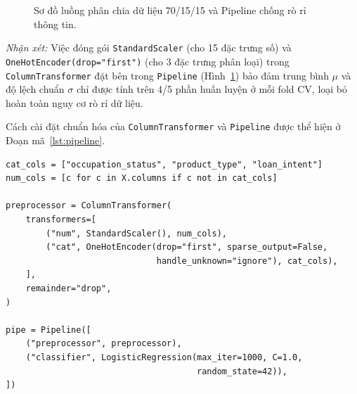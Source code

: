 \documentclass[12pt,a4paper,oneside]{report}
\begin{document}
\begin{figure}[H]
  \centering
  \caption{Sơ đồ luồng phân chia dữ liệu 70/15/15 và Pipeline chống rò rỉ thông tin.}
  \label{fig:quytrinhhuanluyen}
\end{figure}

\textit{Nhận xét:} Việc đóng gói \texttt{StandardScaler} (cho 15 đặc trưng số) và \texttt{OneHotEncoder(drop="first")} (cho 3 đặc trưng phân loại) trong \texttt{ColumnTransformer} đặt bên trong \texttt{Pipeline} (Hình~\ref{fig:quytrinhhuanluyen}) bảo đảm trung bình $\mu$ và độ lệch chuẩn $\sigma$ chỉ được tính trên 4/5 phần huấn luyện ở mỗi fold CV, loại bỏ hoàn toàn nguy cơ rò rỉ dữ liệu.

Cách cài đặt chuẩn hóa của \texttt{ColumnTransformer} và \texttt{Pipeline} được thể hiện ở Đoạn mã~\ref{lst:pipeline}.

\begin{lstlisting}[caption={Thiết lập Pipeline tiền xử lý khép kín bằng ColumnTransformer.},label={lst:pipeline}]
cat_cols = ["occupation_status", "product_type", "loan_intent"]
num_cols = [c for c in X.columns if c not in cat_cols]

preprocessor = ColumnTransformer(
    transformers=[
        ("num", StandardScaler(), num_cols),
        ("cat", OneHotEncoder(drop="first", sparse_output=False,
                              handle_unknown="ignore"), cat_cols),
    ],
    remainder="drop",
)

pipe = Pipeline([
    ("preprocessor", preprocessor),
    ("classifier", LogisticRegression(max_iter=1000, C=1.0,
                                      random_state=42)),
])
\end{lstlisting}
\end{document}
